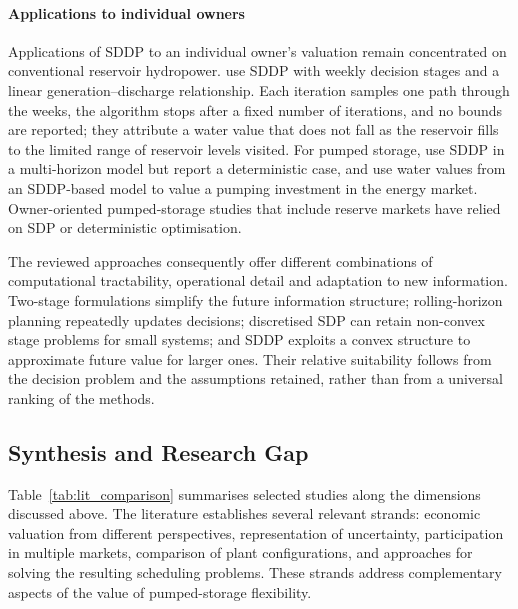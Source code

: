 \paragraph{Applications to individual owners}
Applications of SDDP to an individual owner's valuation remain
concentrated on conventional reservoir hydropower.
\citet{bore2026assessing} use SDDP with weekly decision stages and a
linear generation--discharge relationship. Each iteration samples one
path through the weeks, the algorithm stops after a fixed number of
iterations, and no bounds are reported; they attribute a water value that
does not fall as the reservoir fills to the limited range of reservoir
levels visited. For pumped storage, \citet{abgottspon2016multihorizon}
use SDDP in a multi-horizon model but report a deterministic case, and
\citet{schuller2024practical} use water values from an SDDP-based model
to value a pumping investment in the energy market. Owner-oriented
pumped-storage studies that include reserve markets have relied on SDP
or deterministic optimisation.

The reviewed approaches consequently offer different combinations of
computational tractability, operational detail and adaptation to new
information. Two-stage formulations simplify the future information
structure; rolling-horizon planning repeatedly updates decisions;
discretised SDP can retain non-convex stage problems for small systems;
and SDDP exploits a convex structure to approximate future value for
larger ones. Their relative suitability follows from the decision
problem and the assumptions retained, rather than from a universal
ranking of the methods.

\subsection{Synthesis and Research Gap}
\label{sec:lit_gap}

Table~\ref{tab:lit_comparison} summarises selected studies along the
dimensions discussed above. The literature establishes several relevant
strands: economic valuation from different perspectives, representation
of uncertainty, participation in multiple markets, comparison of plant
configurations, and approaches for solving the resulting scheduling
problems. These strands address complementary aspects of the value of
pumped-storage flexibility.

